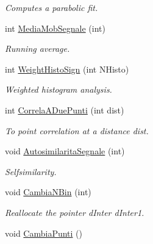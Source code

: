 \begin{DoxyCompactItemize}
\begin{DoxyCompactList}\small\item\em \-Computes a parabolic fit. \end{DoxyCompactList}\item 
\hypertarget{classVarDatFile_af61093b90aceaaeaabfaf6364db43abf}{int \hyperlink{classVarDatFile_af61093b90aceaaeaabfaf6364db43abf}{\-Media\-Mob\-Segnale} (int)}\label{classVarDatFile_af61093b90aceaaeaabfaf6364db43abf}

\begin{DoxyCompactList}\small\item\em \-Running average. \end{DoxyCompactList}\item 
int \hyperlink{classVarDatFile_ad6521d627ba809d5e253cefcd5090491}{\-Weight\-Histo\-Sign} (int \-N\-Histo)
\begin{DoxyCompactList}\small\item\em \-Weighted histogram analysis. \end{DoxyCompactList}\item 
\hypertarget{classVarDatFile_aa6212bdcf240e866f234a41d6b98a224}{int \hyperlink{classVarDatFile_aa6212bdcf240e866f234a41d6b98a224}{\-Correla\-A\-Due\-Punti} (int dist)}\label{classVarDatFile_aa6212bdcf240e866f234a41d6b98a224}

\begin{DoxyCompactList}\small\item\em \-To point correlation at a distance dist. \end{DoxyCompactList}\item 
\hypertarget{classVarDatFile_ae1058d878c5370add56411e3998b9d51}{void \hyperlink{classVarDatFile_ae1058d878c5370add56411e3998b9d51}{\-Autosimilarita\-Segnale} (int)}\label{classVarDatFile_ae1058d878c5370add56411e3998b9d51}

\begin{DoxyCompactList}\small\item\em \-Selfsimilarity. \end{DoxyCompactList}\item 
\hypertarget{classVarDatFile_af0b16f63863e97d7c86f9ac00e67f11b}{void \hyperlink{classVarDatFile_af0b16f63863e97d7c86f9ac00e67f11b}{\-Cambia\-N\-Bin} (int)}\label{classVarDatFile_af0b16f63863e97d7c86f9ac00e67f11b}

\begin{DoxyCompactList}\small\item\em \-Reallocate the pointer d\-Inter d\-Inter1. \end{DoxyCompactList}\item 
\hypertarget{classVarDatFile_ad399f5baf6ac6cda47416f07b69b3ca8}{void \hyperlink{classVarDatFile_ad399f5baf6ac6cda47416f07b69b3ca8}{\-Cambia\-Punti} ()}\label{classVarDatFile_ad399f5baf6ac6cda47416f07b69b3ca8}


\end{DoxyCompactItemize}
